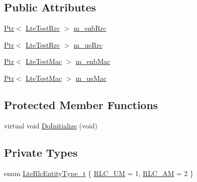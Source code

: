 \subsection*{Public Attributes}
\begin{DoxyCompactItemize}
\item 
\hyperlink{classns3_1_1Ptr}{Ptr}$<$ \hyperlink{classns3_1_1LteTestRrc}{Lte\+Test\+Rrc} $>$ \hyperlink{classns3_1_1LteSimpleHelper_a89ce7ea3468b4cbea029490a6451052e}{m\+\_\+enb\+Rrc}
\item 
\hyperlink{classns3_1_1Ptr}{Ptr}$<$ \hyperlink{classns3_1_1LteTestRrc}{Lte\+Test\+Rrc} $>$ \hyperlink{classns3_1_1LteSimpleHelper_a21a115de62aaa22c3278c1154057b5f2}{m\+\_\+ue\+Rrc}
\item 
\hyperlink{classns3_1_1Ptr}{Ptr}$<$ \hyperlink{classns3_1_1LteTestMac}{Lte\+Test\+Mac} $>$ \hyperlink{classns3_1_1LteSimpleHelper_a953ff7bc15f6b310a13d35581c2fecef}{m\+\_\+enb\+Mac}
\item 
\hyperlink{classns3_1_1Ptr}{Ptr}$<$ \hyperlink{classns3_1_1LteTestMac}{Lte\+Test\+Mac} $>$ \hyperlink{classns3_1_1LteSimpleHelper_a963987a7323f3f7b1cefbc0e0bc367bc}{m\+\_\+ue\+Mac}
\end{DoxyCompactItemize}
\subsection*{Protected Member Functions}
\begin{DoxyCompactItemize}
\item 
virtual void \hyperlink{classns3_1_1LteSimpleHelper_afcaae970bd46db0b412184f6dd460090}{Do\+Initialize} (void)
\end{DoxyCompactItemize}
\subsection*{Private Types}
\begin{DoxyCompactItemize}
\item 
enum \hyperlink{classns3_1_1LteSimpleHelper_a9b2b072cbdc391cd95182aa16048befc}{Lte\+Rlc\+Entity\+Type\+\_\+t} \{ \hyperlink{classns3_1_1LteSimpleHelper_a9b2b072cbdc391cd95182aa16048befcafd0e89cd3022420fb4b4aac5a5d7484f}{R\+L\+C\+\_\+\+UM} = 1, 
\hyperlink{classns3_1_1LteSimpleHelper_a9b2b072cbdc391cd95182aa16048befca1a9cce9654ef5019efbeeee1360d0276}{R\+L\+C\+\_\+\+AM} = 2
 \}
\end{DoxyCompactItemize}
